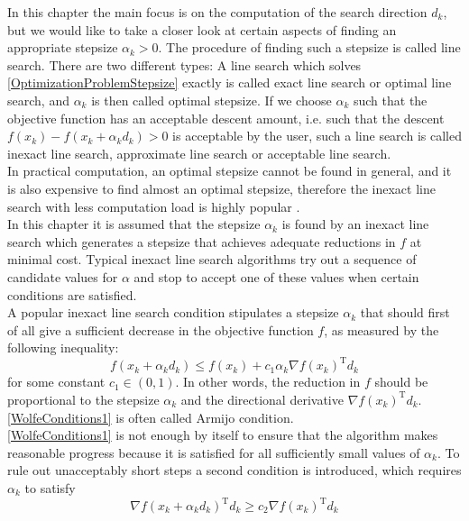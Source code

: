 In this chapter the main focus is on the computation of the search direction $d_k$, but we would like to take a closer look at certain aspects of finding an appropriate stepsize $\alpha_k > 0$. The procedure of finding such a stepsize is called line search. There are two different types: A line search which solves \cref{OptimizationProblemStepsize} exactly is called exact line search or optimal line search, and $\alpha_k$ is then called optimal stepsize. If we choose $\alpha_k$ such that the objective function has an acceptable descent amount, i.e. such that the descent $f(x_k) - f(x_k + \alpha_k d_k) > 0$ is acceptable by the user, such a line search is called inexact line search, approximate line search or acceptable line search. \\
In practical computation, an optimal stepsize cannot be found in general, and it is also expensive to find almost an optimal stepsize, therefore the inexact line search with less computation load is highly popular \cite[p.~72]{SunYuan:2006}. \\
In this chapter it is assumed that the stepsize $\alpha_k$ is found by an inexact line search which generates a stepsize that achieves adequate reductions in $f$ at minimal cost. Typical inexact line search algorithms try out a sequence of candidate values for $\alpha$ and stop to accept one of these values when certain conditions are satisfied. \\
A popular inexact line search condition stipulates a stepsize $\alpha_k$ that should first of all give a sufficient decrease in the objective function $f$, as measured by the following inequality:
\begin{equation}\label{WolfeConditions1}
    f(x_k + \alpha_k d_k) \leq f(x_k) + c_1 \alpha_k \nabla f(x_k)^{\mathrm{T}} d_k
\end{equation}
for some constant $c_1 \in (0, 1)$. In other words, the reduction in $f$ should be proportional to the stepsize $\alpha_k$ and the directional derivative $\nabla f(x_k)^{\mathrm{T}} d_k$. \cref{WolfeConditions1} is often called Armijo condition. \\
\cref{WolfeConditions1} is not enough by itself to ensure that the algorithm makes reasonable progress because it is satisfied for all sufficiently small values of $\alpha_k$. To rule out unacceptably short steps a second condition is introduced, which requires $\alpha_k$ to satisfy
\begin{equation}\label{WolfeConditions2}
    \nabla f(x_k + \alpha_k d_k)^{\mathrm{T}} d_k \geq c_2 \nabla f(x_k)^{\mathrm{T}} d_k
\end{equation}

